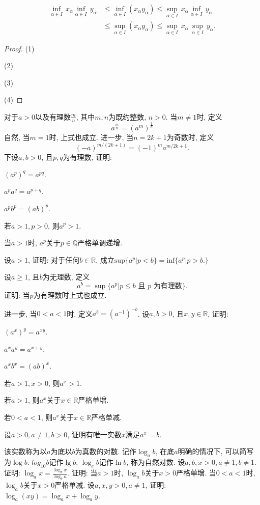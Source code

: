 \begin{quiza}
\begin{quizs}
\[\begin{split}
\underset{\alpha\in I}{\inf}\,x_\alpha\underset{\alpha\in I}{\inf}\,y_\alpha&\leqslant \underset{\alpha\in I}{\inf}(x_\alpha y_\alpha)\leqslant\underset{\alpha\in I}{\sup}\,x_\alpha\underset{\alpha\in I}{\inf}\,y_\alpha\\&\leqslant
\underset{\alpha\in I}{\sup}(x_\alpha y_\alpha)\leqslant\underset{\alpha\in I}{\sup}\,x_\alpha\,\underset{\alpha\in I}{\sup}\,y_\alpha.
\end{split}\]
\end{quizs}
\begin{proof}
(1)

(2)

(3)

(4)
\end{proof}
\end{quiza}
\begin{quizb}
\woe 对于\(a>0\)以及有理数\(\frac{m}{n}\), 其中\(m,n\)为既约整数, \(n>0\). 当\(m\ne 1\)时, 定义\[a^{\frac{m}{n}}=\left(a^m\right)^\frac{1}{n}\]
        自然, 当\(m=1\)时, 上式也成立. 进一步, 当\(n=2k+1\)为奇数时, 定义\[(-a)^{m/(2k+1)}=(-1)^ma^{m/2k+1}.\]下设\(a,b>0\), 且\(p,q\)为有理数, 证明:
\begin{compactenum}[\quad (1)]
            \item \((a^p)^q=a^{pq}\).
            \item \(a^pa^q=a^{p+q}\).
            \item \(a^pb^p=(ab)^p\).
            \item 若\(a>1,p>0\), 则\(a^p>1\).
            \item 当\(a>1\)时, \(a^p\)关于\(p\in\mathbb{Q}\)严格单调递增.
            \item 设\(a>1\), 证明: 对于任何\(b\in\mathbb{R}\), 成立\(\mathrm{sup}\{a^p|p<b\}=\mathrm{inf}\{a^p|p>b.\}\)
\end{compactenum}
\woe 设\(a\geqslant 1\), 且\(b\)为无理数, 定义\[a^b=\sup\{a^p|p\leqslant b \text{ 且 }p\text{ 为有理数}\}.\]
证明: 当\(p\)为有理数时上式也成立. 

进一步, 当\(0<a<1\)时, 定义\(a^b=(a^{-1})^{-b}\).
\woe 设\(a,b>0\), 且\(x,y\in \mathbb{R}\), 证明:
\begin{quizcs}
\item \(\left(a^x\right)^y=a^{xy}\).
\item \(a^xa^y=a^{x+y}\).
\item \(a^xb^x=(ab)^x\).
\item 若\(a>1,x>0\), 则\(a^x>1\).
\item 若\(a>1\), 则\(a^x\)关于\(x\in \mathbb{R}\)严格单增.
\item 若\(0<a<1\), 则\(a^x\)关于\(x\in \mathbb{R}\)严格单减.
\end{quizcs}
\woe 设\(a>0,a\ne 1,b>0\), 证明有唯一实数\(x\)满足\(a^x=b\).
        
该实数称为以\(a\)为底以\(b\)为真数的对数. 记作\(\log_ab\), 在底\(a\)明确的情况下, 可以简写为\(\log b\). \(log_{10}b\)记作\(\lg b\), \(\log_eb\)记作\(\ln b\), 称为自然对数.
\woe 设\(a,b,x>0,a\ne 1,b\ne 1\). 证明: \(\log_ax=\frac{\log_bx}{\log_ba}\).
\woe 证明: 当\(a>1\)时, \(\log_ab\)关于\(x>0\)严格单增. 当\(0<a<1\)时, \(\log_ab\)关于\(x>0\)严格单减.
\woe 设\(a,x,y>0,a\ne 1\), 证明: \(\log_a(xy)=\log_ax+\log_ay\). 
\end{quizb}
